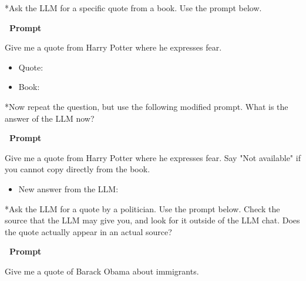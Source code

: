 \documentclass[12pt]{article}
\makeatletter
\newcounter{question}
\newlength\questionheight
\newcommand{\question}{\@ifstar{\question@text}{\question@field}}
\newcommand{\question@heading}[1]{%
  \refstepcounter{question}%
  \vspace{0.3cm}%
  \noindent\textbf{\faEdit\ Question \thequestion: #1}%
}
\newcommand{\question@text}[1]{%
  \question@heading{#1}%
}
\newcommand{\question@field}[2][\questionheight]{%
  \question@heading{#2}%
 \\[0.3em] \begin{Form}
    \TextField[
      name=Q\thequestion,
      multiline=true,
      width=\linewidth,
      height=#1,
      charsize=10pt,
      bordercolor={0 0 0},
      borderwidth=1.8,
      backgroundcolor={1 1 1}
    ]{}
  \end{Form}
  \vspace{0.3cm}%
}
\makeatother
\begin{document}
\question*{Ask the LLM for a specific quote from a book. Use the prompt below.}

\vspace{0.3cm}
\textcolor{maincolor}{\textbf{\faCopy\ Prompt}}
\begin{promptbox}
Give me a quote from Harry Potter where he expresses fear.
\end{promptbox}

\begin{Form}
\begin{itemize}
    \item Quote: \\[0.2cm]
\TextField[name=quoteharry,width=\linewidth,height=0.4cm,multiline=true, bordercolor={0 0 0}]{}
    \item Book: \\[0.2cm]
\TextField[name=bookharry,width=\linewidth,height=0.4cm,multiline=true, bordercolor={0 0 0}]{}
\end{itemize}
\end{Form}

\question*{Now repeat the question, but use the following modified prompt. What is the answer of the LLM now?}

\vspace{0.3cm}
\textcolor{maincolor}{\textbf{\faCopy\ Prompt}}\nopagebreak
\begin{promptbox}
Give me a quote from Harry Potter where he expresses fear. Say "Not available" if you cannot copy directly from the book.
\end{promptbox}
\begin{Form}
\begin{itemize}
    \item New answer from the LLM: \\[0.2cm]
\TextField[name=newquoteharry,width=\linewidth,height=2cm,multiline=true, bordercolor={0 0 0}]{}
\end{itemize}
\end{Form}
\vspace{0.5cm}

\question*{Ask the LLM for a quote by a politician. Use the prompt below. Check the source that the LLM may give you, and look for it outside of the LLM chat. Does the quote actually appear in an actual source?}

\vspace{0.3cm}
\textcolor{maincolor}{\textbf{\faCopy\ Prompt}}\nopagebreak
\begin{promptbox}
Give me a quote of Barack Obama about immigrants.
\end{promptbox}
\end{document}
